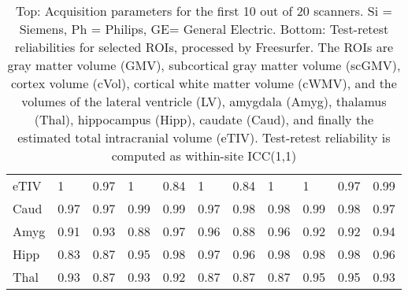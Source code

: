 \begin{table}
\begin{tabular}{lllllllllll}
eTIV &      1 &   0.97 &      1 &   0.84 &                     1 &   0.84 &                     1 &      1 &   0.97 &   0.99 \\
Caud                       &   0.97 &   0.97 &   0.99 &   0.99 &                  0.97 &   0.98 &                  0.98 &   0.99 &   0.98 &   0.97 \\
Amyg                      &   0.91 &   0.93 &   0.88 &   0.97 &                  0.96 &   0.88 &                  0.96 &   0.92 &   0.92 &   0.94 \\
Hipp                   &   0.83 &   0.87 &   0.95 &   0.98 &                  0.97 &   0.96 &                  0.98 &   0.98 &   0.98 &   0.96 \\
Thal               &   0.93 &   0.87 &   0.93 &   0.92 &                  0.87 &   0.87 &                  0.87 &   0.95 &   0.95 &   0.93 \\
\bottomrule
\end{tabular}
\caption{Top: Acquisition parameters for the first 10 out of 20 scanners. Si = Siemens, Ph = Philips, GE= General Electric. Bottom: Test-retest reliabilities for selected ROIs, processed by Freesurfer. The ROIs are gray matter volume (GMV), subcortical gray matter volume (scGMV), cortex volume (cVol), cortical white matter volume (cWMV), and the volumes of the lateral ventricle (LV), amygdala (Amyg), thalamus (Thal), hippocampus (Hipp), caudate (Caud), and finally the estimated total intracranial volume (eTIV). Test-retest reliability is computed as within-site ICC(1,1)} 
\label{tab:acquisition1}

\end{table}